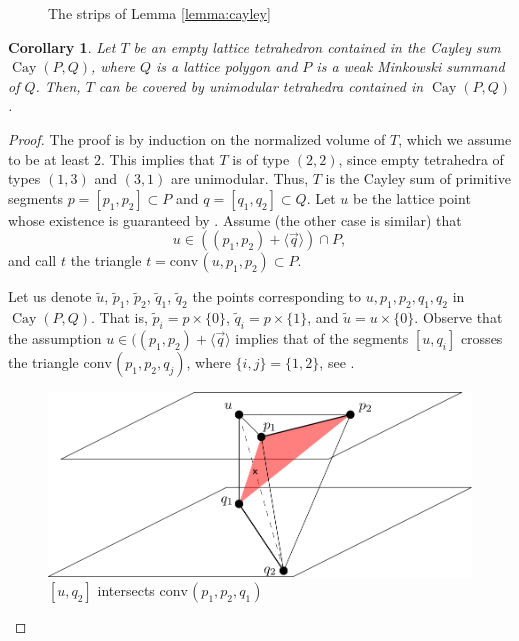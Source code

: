 \documentclass{amsart}
\theoremstyle{plain}
\newtheorem{corollary}[theorem]{Corollary}
\theoremstyle{definition}
\renewcommand{\vec}[1]{\overrightarrow#1}
\newcommand{\vecline}[1]{\langle \vec #1 \rangle}
\newcommand{\conv}{\ensuremath{\mathrm{conv}}\hspace{1pt}}
\newcommand{\cayley}{\operatorname{Cay}}
\begin{document}
\begin{figure}[htb]
\scalebox{.75}{}
\caption{The strips  of Lemma \ref{lemma:cayley}}
\label{fig:strips}
\end{figure}

\begin{corollary}
\label{coro:covercayley}
Let $T$ be an empty lattice tetrahedron contained in the Cayley sum $\cayley(P,Q)$, where $Q$ is a lattice polygon and $P$ is a weak Minkowski summand of $Q$. Then, $T$ can be covered by unimodular tetrahedra contained in $\cayley(P,Q)$.
\end{corollary}

\begin{proof}
The proof is by induction on the normalized volume of $T$, which we assume to be at least $2$. This implies that $T$ is of type $(2,2)$,
since empty tetrahedra of types $(1,3)$ and $(3,1)$ are unimodular. Thus, $T$ is the Cayley sum of primitive segments $p=[p_1,p_2]\subset P$ and $q=[q_1,q_2]\subset Q$.  
Let $u$ be the lattice point whose existence is guaranteed by . Assume  (the other case is similar) that 
\[
u \in ((p_1, p_2) + \vecline q ) \cap P,
\]
and call $t$ the triangle $t=\conv( u,  p_1,  p_2)\subset P$.

Let us denote $\tilde u$, $\tilde p_1$, $\tilde p_2$, $\tilde q_1$, $\tilde q_2$ the points corresponding to $u, p_1, p_2, q_1, q_2$ in $\cayley(P,Q)$.
That is, $\tilde p_i = p\times\{0\}$, $\tilde q_i = p\times\{1\}$, and $\tilde u = u\times\{0\}$.
Observe that the assumption $u\in((p_1, p_2) + \vecline q$ implies that of the segments $[u,q_i]$ crosses the triangle $\conv(p_1,p_2,q_j)$, where $\{i,j\}=\{1,2\}$, see . 

\begin{figure}[htb]
\includegraphics[scale=.3]{flip}
\caption{$[u,q_2]$ intersects $\conv(p_1,p_2,q_1)$}
\label{fig:flip}
\end{figure}


\end{proof}
\end{document}
